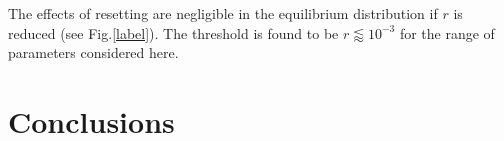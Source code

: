 \documentclass[a4paper,12pt,reqno,superscriptaddress,nofootinbib]{article}
\theoremstyle{plain}
\theoremstyle{definition}
\theoremstyle{remark}
\newcommand{\0}{^{(0)}}
\newcommand{\1}{^{(1)}}
\newcommand{\2}{^{(2)}}
\begin{document}
The effects of resetting are negligible in the equilibrium distribution if $r$ is reduced (see Fig.\ref{label}). The threshold is found to be $r\lessapprox 10^{-3}$ for the range of parameters considered here.




\section {Conclusions}\label{con}







\end{document}
